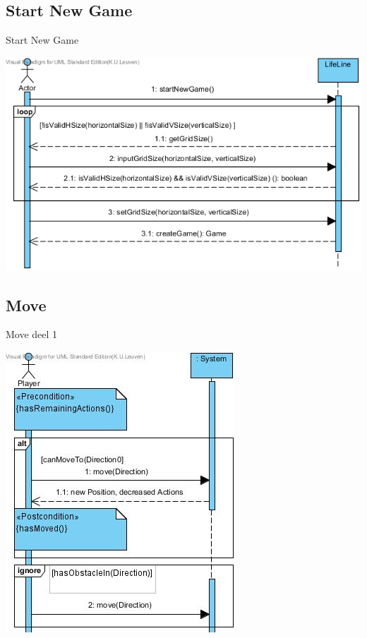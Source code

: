 \documentclass[t]{beamer}
\begin{document}
\subsection{Start New Game}
\begin{frame}{Start New Game}
\begin{center}
\includegraphics[width=0.90\linewidth]{images/SSDStartNewGame}
\end{center}
\end{frame}

\subsection{Move}
\begin{frame}{Move deel 1}
\begin{center}
\includegraphics[scale=0.6]{images/SSDMove1}
\end{center}
\end{frame}
\end{document}
